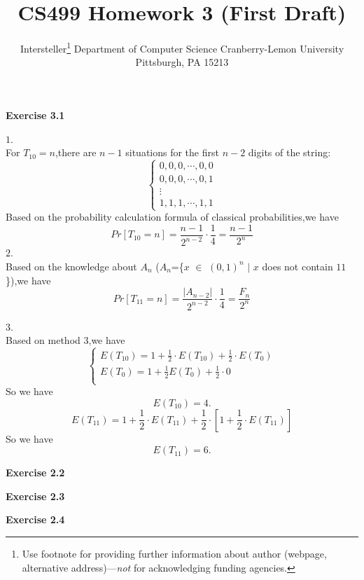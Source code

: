 \documentclass{article} %
\title{CS499 Homework 3 (First Draft)}
\author{
	Intersteller\thanks{ Use footnote for providing further information
		about author (webpage, alternative address)---\emph{not} for acknowledging
		funding agencies.}
	Department of Computer Science
	Cranberry-Lemon University
	Pittsburgh, PA 15213
}
\begin{document}
	
	
	\maketitle
	
	
	\textbf{Exercise 3.1}\par
    $1$.\\
    For $T_{10}=n$,there are $n-1$ situations for the first $n-2$ digits of the string:
    $$ \left\{
    \begin{aligned}
    0,0,0,\cdots,0,0 \\
    0,0,0,\cdots,0,1 \\
    \vdots\\
    1,1,1,\cdots,1,1
    \end{aligned}
    \right.
    $$
    Based on the probability calculation formula of classical probabilities,we have
    $$
    Pr\left[T_{10}=n\right]=\frac{n-1}{2^{n-2}}\cdot\frac{1}{4}=\frac{n-1}{2^n}
    $$
    $2$.\\
    Based on the knowledge about $A_n$ ($A_n$=\{$x$ $\in$ $(0,1)^n$ $|$ $x$ does not contain $11$\}),we have
    $$
    Pr\left[T_{11}=n\right]=\frac{|A_{n-2}|}{2^{n-2}}\cdot\frac{1}{4}=\frac{F_n}{2^n}
    $$
    
    $3$.\\
    Based on method $3$,we have
    $$ \left\{
    \begin{aligned}
    E(T_{10})=1+\frac{1}{2}\cdot E(T_{10})+\frac{1}{2}\cdot E(T_0) \\
    E(T_0)=1+\frac{1}{2}E(T_0)+\frac{1}{2}\cdot 0 \\
    \end{aligned}
    \right.
    $$
    So we have
    $$
    E(T_{10})=4.
    $$
    $$
    E(T_{11})=1+\frac{1}{2}\cdot E(T_{11})+\frac{1}{2}\cdot [1+\frac{1}{2}\cdot E(T_{11})]
    $$
    So we have
    $$
    E(T_{11})=6.
    $$



	



	\textbf{Exercise 2.2}\par






	
	



	
	\textbf{Exercise 2.3}\par
	





	\textbf{Exercise 2.4}\par
	
\end{document}
